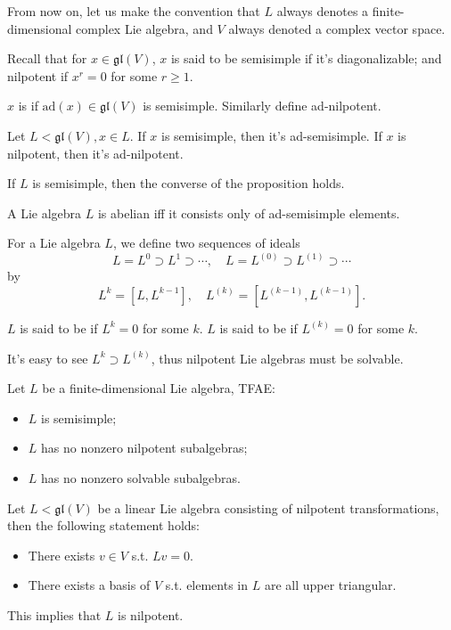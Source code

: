 From now on, let us make the convention that
$L$ always denotes a finite-dimensional complex Lie algebra,
and $V$ always denoted a complex vector space.

Recall that for $x\in \mathfrak{gl}(V)$,
$x$ is said to be semisimple if it's diagonalizable;
and nilpotent if $x^r = 0$ for some $r\ge 1$.

\begin{definition}
	$x$ is  if $\mathrm{ad}(x)\in \mathfrak{gl}(V)$
	is semisimple.
	Similarly define ad-nilpotent.
\end{definition}

\begin{proposition}
	Let $L<\mathfrak{gl}(V), x\in L$.
	If $x$ is semisimple, then it's ad-semisimple. If $x$ is nilpotent,
	then it's ad-nilpotent.
\end{proposition}
\begin{remark}
    If $L$ is semisimple, then the converse of the proposition holds.
\end{remark}

\begin{theorem}
    A Lie algebra $L$ is abelian iff it consists only of ad-semisimple elements.
\end{theorem}

For a Lie algebra $L$, we define two sequences of ideals
\[
L = L^0 \supset L^1 \supset \cdots, \quad L = L^{(0)} \supset L^{(1)} \supset \cdots
\]
by
\[
	L^k = [L, L^{k-1}],\quad L^{(k)} = [L^{(k-1)}, L^{(k-1)}].
\]
\begin{definition}
	$L$ is said to be  if $L^k = 0$ for some $k$.
	$L$ is said to be  if $L^{(k)} = 0$ for some $k $.
\end{definition}

It's easy to see $L^k \supset L^{(k)}$, thus nilpotent Lie algebras
must be solvable.

\begin{proposition}
	Let $L$ be a finite-dimensional Lie algebra, TFAE:
	\begin{itemize}
		\item $L$ is semisimple;
		\item $L$ has no nonzero nilpotent subalgebras;
		\item $L$ has no nonzero solvable subalgebras.
	\end{itemize}
\end{proposition}

\begin{theorem}[Engel]
    Let $L<\mathfrak{gl}(V)$ be a linear Lie algebra consisting of nilpotent
	transformations, then the following statement holds:
	\begin{itemize}
		\item There exists $v\in V$ s.t. $Lv = 0$.
		\item There exists a basis of $V$ s.t. elements in $L$ are all
			upper triangular.
	\end{itemize}
\end{theorem}
\begin{remark}
    This implies that $L$ is nilpotent.
\end{remark}
